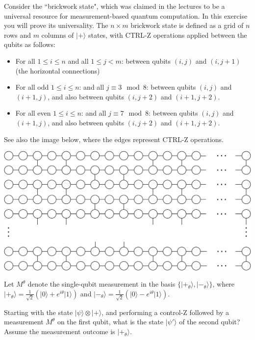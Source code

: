 \documentclass[a4paper,10pt,landscape,twocolumn]{scrartcl}
\newcommand{\ket}[1]{\lvert #1 \rangle}
\begin{document}
\begin{exercise}
	Consider the ``brickwork state", which was claimed in the lectures to be a universal resource for measurement-based quantum computation. In this exercise you will prove its universality. The $n \times m$ brickwork state is defined as a grid of $n$ rows and $m$ columns of $\ket{+}$ states, with CTRL-Z operations applied between the qubits as follows:
	\begin{itemize}
		\item For all $1 \leq i \leq n$ and all $1 \leq j < m$: between qubits $(i,j)$ and $(i,j+1)$ (the horizontal connections)
		\item For all odd $1 \leq i \leq n$: and all $j \equiv 3 \mod 8$: between qubits $(i,j)$ and $(i+1,j)$, and also between qubits $(i, j+2)$ and $(i+1,j+2)$.
		\item For all even $1 \leq i \leq n$: and all $j \equiv 7 \mod 8$: between qubits $(i,j)$ and $(i+1,j)$, and also between qubits $(i, j+2)$ and $(i+1,j+2)$.
	\end{itemize}
	See also the image below, where the edges represent CTRL-Z operations.
	\begin{center}
	\includegraphics[width=\columnwidth]{10-practice-img1.png}
	\end{center}
	Let $M^{\theta}$ denote the single-qubit measurement in the basis $\{\ket{+_{\theta}}, \ket{-_\theta}\}$, where $\ket{+_{\theta}} = \frac{1}{\sqrt{2}}(\ket0 + e^{i\theta}\ket1)$ and $\ket{-_{\theta}} = \frac{1}{\sqrt{2}}(\ket0 - e^{i\theta}\ket1)$.
	\begin{subex}
		Starting with the state $\ket{\psi} \otimes \ket{+}$, and performing a control-Z followed by a measurement $M^\theta$ on the first qubit, what is the state $\ket{\psi'}$ of the second qubit? Assume the measurement outcome is $\ket{+_{\theta}}$.
		

\end{subex}
\end{exercise}
\end{document}
